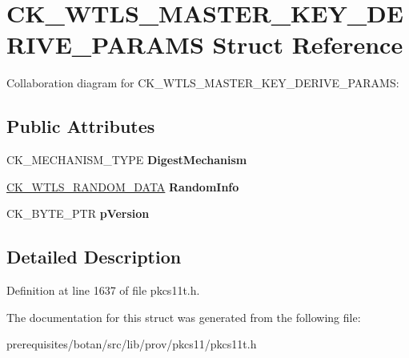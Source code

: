 \hypertarget{struct_c_k___w_t_l_s___m_a_s_t_e_r___k_e_y___d_e_r_i_v_e___p_a_r_a_m_s}{}\section{C\+K\+\_\+\+W\+T\+L\+S\+\_\+\+M\+A\+S\+T\+E\+R\+\_\+\+K\+E\+Y\+\_\+\+D\+E\+R\+I\+V\+E\+\_\+\+P\+A\+R\+A\+MS Struct Reference}
\label{struct_c_k___w_t_l_s___m_a_s_t_e_r___k_e_y___d_e_r_i_v_e___p_a_r_a_m_s}


Collaboration diagram for C\+K\+\_\+\+W\+T\+L\+S\+\_\+\+M\+A\+S\+T\+E\+R\+\_\+\+K\+E\+Y\+\_\+\+D\+E\+R\+I\+V\+E\+\_\+\+P\+A\+R\+A\+MS\+:
\subsection*{Public Attributes}
\begin{DoxyCompactItemize}
\item 
\mbox{\label{struct_c_k___w_t_l_s___m_a_s_t_e_r___k_e_y___d_e_r_i_v_e___p_a_r_a_m_s_ad9f74c384a9226b0c2adea1b32fb10b2}} 
C\+K\+\_\+\+M\+E\+C\+H\+A\+N\+I\+S\+M\+\_\+\+T\+Y\+PE {\bfseries Digest\+Mechanism}
\item 
\mbox{\label{struct_c_k___w_t_l_s___m_a_s_t_e_r___k_e_y___d_e_r_i_v_e___p_a_r_a_m_s_af7d855b182a5300a76fc7300c1c6ebaa}} 
\mbox{\hyperlink{struct_c_k___w_t_l_s___r_a_n_d_o_m___d_a_t_a}{C\+K\+\_\+\+W\+T\+L\+S\+\_\+\+R\+A\+N\+D\+O\+M\+\_\+\+D\+A\+TA}} {\bfseries Random\+Info}
\item 
\mbox{\label{struct_c_k___w_t_l_s___m_a_s_t_e_r___k_e_y___d_e_r_i_v_e___p_a_r_a_m_s_ac90dc51250d0ccbe76a8dde765d1e1cf}} 
C\+K\+\_\+\+B\+Y\+T\+E\+\_\+\+P\+TR {\bfseries p\+Version}
\end{DoxyCompactItemize}


\subsection{Detailed Description}


Definition at line 1637 of file pkcs11t.\+h.



The documentation for this struct was generated from the following file\+:\begin{DoxyCompactItemize}
\item 
prerequisites/botan/src/lib/prov/pkcs11/pkcs11t.\+h\end{DoxyCompactItemize}
